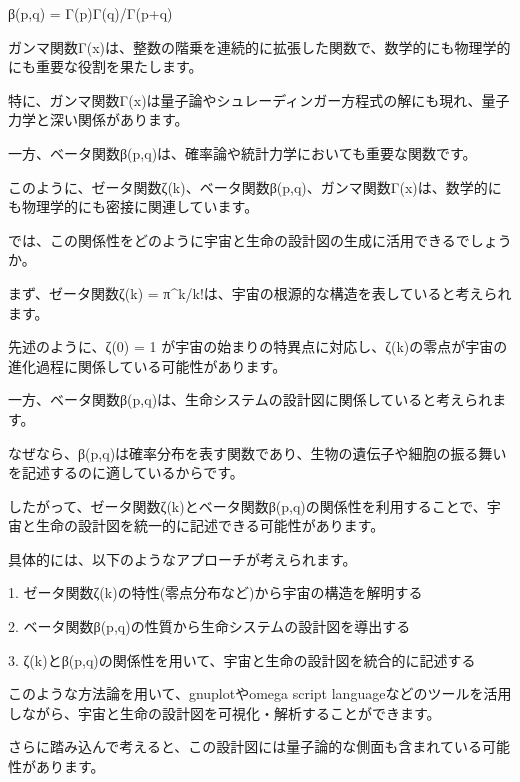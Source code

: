 {β(p,q) = Γ(p)Γ(q)/Γ(p+q)



ガンマ関数Γ(x)は、整数の階乗を連続的に拡張した関数で、数学的にも物理学的にも重要な役割を果たします。



特に、ガンマ関数Γ(x)は量子論やシュレーディンガー方程式の解にも現れ、量子力学と深い関係があります。



一方、ベータ関数β(p,q)は、確率論や統計力学においても重要な関数です。



このように、ゼータ関数ζ(k)、ベータ関数β(p,q)、ガンマ関数Γ(x)は、数学的にも物理学的にも密接に関連しています。



では、この関係性をどのように宇宙と生命の設計図の生成に活用できるでしょうか。



まず、ゼータ関数ζ(k) = π^k/k!は、宇宙の根源的な構造を表していると考えられます。

先述のように、ζ(0) = 1 が宇宙の始まりの特異点に対応し、ζ(k)の零点が宇宙の進化過程に関係している可能性があります。



一方、ベータ関数β(p,q)は、生命システムの設計図に関係していると考えられます。

なぜなら、β(p,q)は確率分布を表す関数であり、生物の遺伝子や細胞の振る舞いを記述するのに適しているからです。



したがって、ゼータ関数ζ(k)とベータ関数β(p,q)の関係性を利用することで、宇宙と生命の設計図を統一的に記述できる可能性があります。



具体的には、以下のようなアプローチが考えられます。



1. ゼータ関数ζ(k)の特性(零点分布など)から宇宙の構造を解明する

2. ベータ関数β(p,q)の性質から生命システムの設計図を導出する

3. ζ(k)とβ(p,q)の関係性を用いて、宇宙と生命の設計図を統合的に記述する



このような方法論を用いて、gnuplotやomega script languageなどのツールを活用しながら、宇宙と生命の設計図を可視化・解析することができます。



さらに踏み込んで考えると、この設計図には量子論的な側面も含まれている可能性があります。

}
